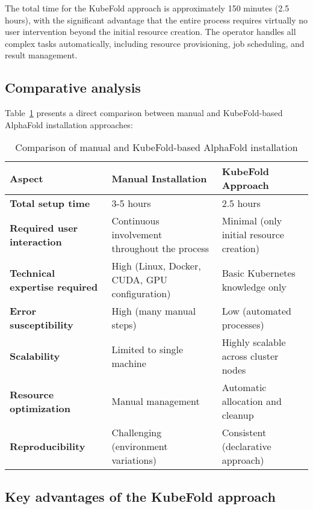 The total time for the KubeFold approach is approximately 150 minutes (2.5 hours), with the significant advantage that the entire process requires virtually no user intervention beyond the initial resource creation. The operator handles all complex tasks automatically, including resource provisioning, job scheduling, and result management.

\subsection{Comparative analysis}

Table~\ref{tab:installation_comparison} presents a direct comparison between manual and KubeFold-based AlphaFold installation approaches:

\begin{table}[H]
    \centering
    \small
    \begin{tabularx}{\textwidth}{|X|X|X|}
        \hline
        \textbf{Aspect} & \textbf{Manual Installation} & \textbf{KubeFold Approach} \\
        \hline
        \textbf{Total setup time} & 3-5 hours & 2.5 hours \\
        \hline
        \textbf{Required user interaction} & Continuous involvement throughout the process & Minimal (only initial resource creation) \\
        \hline
        \textbf{Technical expertise required} & High (Linux, Docker, CUDA, GPU configuration) & Basic Kubernetes knowledge only \\
        \hline
        \textbf{Error susceptibility} & High (many manual steps) & Low (automated processes) \\
        \hline
        \textbf{Scalability} & Limited to single machine & Highly scalable across cluster nodes \\
        \hline
        \textbf{Resource optimization} & Manual management & Automatic allocation and cleanup \\
        \hline
        \textbf{Reproducibility} & Challenging (environment variations) & Consistent (declarative approach) \\
        \hline
    \end{tabularx}
    \caption{Comparison of manual and KubeFold-based AlphaFold installation}
    \label{tab:installation_comparison}
\end{table}

\subsection{Key advantages of the KubeFold approach}

